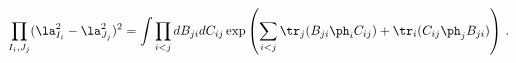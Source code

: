 \begin{equation}
\prod_{I_i, J_j}^{} (\la_{I_i}^2 - \la_{J_j}^2)^2 = \int \prod_{i< j}dB_{ji}
dC_{ij} \exp\left(\sum_{i< j}\tr_j( B_{ji}\ph_{i}C_{ij}) + \tr_i (C_{ij}\ph%
_{j}B_{ji})\right)\, .
\end{equation}

